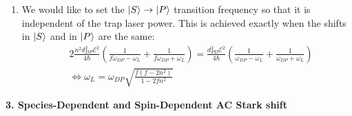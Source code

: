\documentclass{article}
\theoremstyle{definition}
\newcommand{\f}[2]{\frac{#1}{#2}}
\newcommand{\lp}{\left(}
\newcommand{\rp}{\right)}
\begin{document}
\begin{enumerate}[label=(\alph*)]
\begin{enumerate}[label=(\roman*)]
		\item We would like to set the $\ket{S}\to \ket{P}$ transition frequency so that it is independent of the trap laser power. This is achieved exactly when the shifts in $\ket{S}$ and in $\ket{P}$ are the same:
		\begin{align*}
		&2\f{n^2d_{DP}^2\mathcal{E}^2}{4\hbar}\lp \f{1}{f\omega_{DP} - \omega_L} + \f{1}{f\omega_{DP} + \omega_L} \rp = \f{d_{PD}^2 \mathcal{E}^2}{4\hbar}\lp \f{1}{\omega_{DP} - \omega_L} + \f{1}{\omega_{DP} + \omega_L} \rp\\
		&\iff \boxed{\omega_L = \omega_{DP} \sqrt{\f{f(f-2n^2)}{1-2fn^2}}  }
		\end{align*}
		
		
	\end{enumerate}
\end{enumerate}


\noindent \textbf{3. Species-Dependent and Spin-Dependent AC Stark shift}	
	
\end{document}
